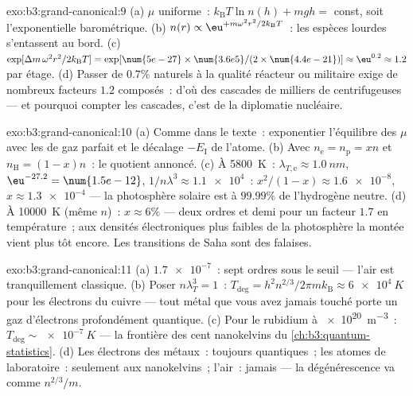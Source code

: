 \begin{solution}{exo:b3:grand-canonical:9}
(a) $\mu$ uniforme~: $k_{\text{B}}T\ln n(h) + mgh = $ const, soit
l'exponentielle barométrique. (b) $n(r) \propto
\eu^{+m\omega^2r^2/2k_{\text{B}}T}$~: les espèces lourdes
s'entassent au bord. (c) $\exp[\Delta m\,\omega^2r^2/2k_{\text{B}}T] =
\exp[\num{5e-27} \times \num{3.6e5}/(2 \times \num{4.4e-21})]
\approx \eu^{0.2} \approx 1.2$ par étage. (d) Passer de
$0.7\%$ naturels à la qualité réacteur ou militaire exige de
nombreux facteurs $1.2$ composés~: d'où des cascades de milliers de
centrifugeuses --- et pourquoi compter les cascades, c'est de la
diplomatie nucléaire.
\end{solution}

\begin{solution}{exo:b3:grand-canonical:10}
(a) Comme dans le texte~: exponentier l'équilibre des $\mu$ avec les
 de gaz parfait et le décalage $-E_{\text{I}}$ de l'atome. (b)
Avec $n_{\text{e}} = n_{\text{p}} = xn$ et $n_{\text{H}} =
(1-x)n$~: le quotient annoncé. (c) À \qty{5800}{K}~:
$\lambda_{T,\text{e}} \approx \qty{1.0}{nm}$,
$\eu^{-27.2} = \num{1.5e-12}$, $1/n\lambda^3 \approx \num{1.1e4}$~:
$x^2/(1-x) \approx \num{1.6e-8}$, $x \approx \num{1.3e-4}$ ---
la photosphère solaire est à $99.99\%$ de l'hydrogène neutre. (d) À
\qty{10000}{K} (même $n$)~: $x \approx 6\%$ --- deux ordres et demi
pour un facteur $1.7$ en température~; aux densités électroniques
plus faibles de la photosphère la montée vient plus tôt encore. Les
transitions de Saha sont des falaises.
\end{solution}

\begin{solution}{exo:b3:grand-canonical:11}
(a) $\num{1.7e-7}$~: sept ordres sous le seuil --- l'air est
tranquillement classique. (b) Poser $n\lambda_T^3 = 1$~: $T_{\text{deg}} =
h^2n^{2/3}/2\pi mk_{\text{B}} \approx \qty{6e4}{K}$ pour les
électrons du cuivre --- tout métal que vous avez jamais touché
porte un gaz d'électrons profondément quantique. (c) Pour le
rubidium à \qty{e20}{m^{-3}}~:
$T_{\text{deg}} \sim \qty{e-7}{K}$ --- la frontière des cent
nanokelvins du \cref{ch:b3:quantum-statistics}. (d) Les électrons
des métaux~: toujours quantiques~; les atomes de laboratoire~:
seulement aux nanokelvins~; l'air~: jamais --- la dégénérescence va
comme $n^{2/3}/m$.
\end{solution}


